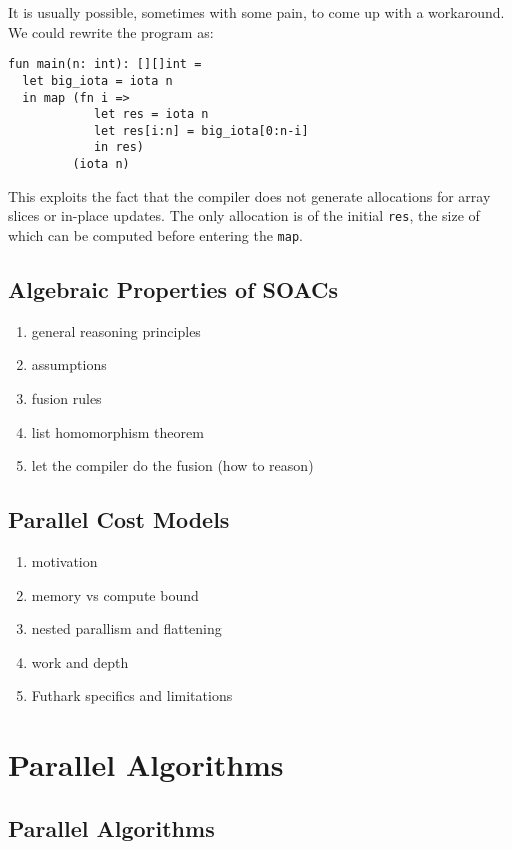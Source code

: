 \documentclass[11pt]{book}
\begin{document}
It is usually possible, sometimes with some pain, to come up with a
workaround.  We could rewrite the program as:

\begin{lstlisting}
fun main(n: int): [][]int =
  let big_iota = iota n
  in map (fn i =>
            let res = iota n
            let res[i:n] = big_iota[0:n-i]
            in res)
         (iota n)
\end{lstlisting}

This exploits the fact that the compiler does not generate allocations
for array slices or in-place updates.  The only allocation is of the
initial \texttt{res}, the size of which can be computed before
entering the \texttt{map}.

\chapter{Algebraic Properties of SOACs}
\label{chap:soac-algebra}

\begin{enumerate}
\item general reasoning principles
\item assumptions
\item fusion rules
\item list homomorphism theorem
\item let the compiler do the fusion (how to reason)
\end{enumerate}

\chapter{Parallel Cost Models}
\begin{enumerate}
\item motivation
\item memory vs compute bound
\item nested parallism and flattening
\item work and depth
\item Futhark specifics and limitations
\end{enumerate}

\part{Parallel Algorithms}

\chapter{Parallel Algorithms}
\label{chap:parallel-algorithms}
\end{document}
